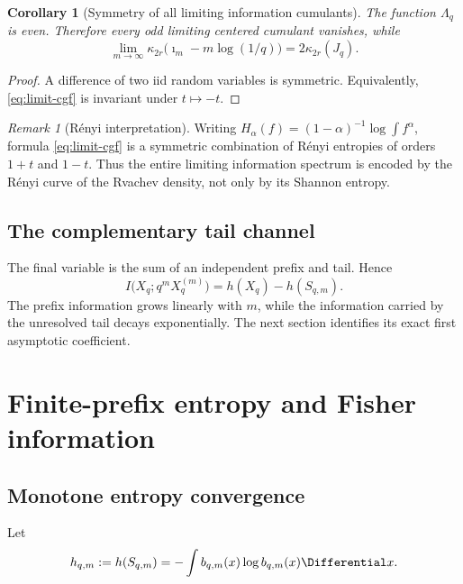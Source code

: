 \documentclass[11pt,oneside]{article}
\newtheorem{corollary}[theorem]{Corollary}
\theoremstyle{definition}
\theoremstyle{remark}
\newtheorem{remark}[theorem]{Remark}
\begin{document}
\begin{corollary}[Symmetry of all limiting information cumulants]
\label{cor:info-cumulants}
The function $\Lambda_q$ is even.  Therefore every odd limiting centered cumulant
vanishes, while
\begin{equation}
 \lim_{m\to\infty}\kappa_{2r}
 \bigl(\imath_m-m\log(1/q)\bigr)
 =2\kappa_{2r}(J_q).
 \label{eq:info-even-cumulants}
\end{equation}
\end{corollary}

\begin{proof}
A difference of two iid random variables is symmetric.  Equivalently,
\eqref{eq:limit-cgf} is invariant under $t\mapsto-t$.
\end{proof}

\begin{remark}[R\'enyi interpretation]
Writing $H_\alpha(f)=(1-\alpha)^{-1}\log\int f^\alpha$, formula
\eqref{eq:limit-cgf} is a symmetric combination of R\'enyi entropies of orders
$1+t$ and $1-t$.  Thus the entire limiting information spectrum is encoded by the
R\'enyi curve of the Rvachev density, not only by its Shannon entropy.
\end{remark}

\subsection{The complementary tail channel}

The final variable is the sum of an independent prefix and tail.  Hence
\begin{equation}
 I\bigl(X_q;q^mX_q^{(m)}\bigr)
 =h(X_q)-h(S_{q,m}).
 \label{eq:tail-information}
\end{equation}
The prefix information grows linearly with $m$, while the information carried by
the unresolved tail decays exponentially.  The next section identifies its exact
first asymptotic coefficient.

\section{Finite-prefix entropy and Fisher information}
\label{sec:fisher-prefix}

\subsection{Monotone entropy convergence}

Let
\begin{equation}
 h_{q,m}:=h(S_{q,m})=-\int b_{q,m}(x)\log b_{q,m}(x)\Differential x.
 \label{eq:prefix-entropy}
\end{equation}
\end{document}
